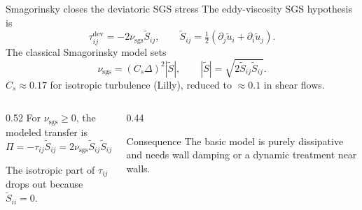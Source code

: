 \documentclass[aspectratio=169,11pt]{beamer}
\begin{document}
\begin{frame}{Smagorinsky closes the deviatoric SGS stress}
The eddy-viscosity SGS hypothesis is
\[
  \tau_{ij}^{\mathrm{dev}}=-2\nu_{\mathrm{sgs}}\widetilde S_{ij},
  \qquad
  \widetilde S_{ij}=\tfrac12(\partial_j\widetilde u_i+\partial_i\widetilde u_j).
\]
The classical Smagorinsky model sets
\[
  \nu_{\mathrm{sgs}}=(C_s\Delta)^2|\widetilde S|,
  \qquad
  |\widetilde S|=\sqrt{2\widetilde S_{ij}\widetilde S_{ij}}.
\]
{\small $C_s\approx0.17$ for isotropic turbulence (Lilly), reduced to $\approx0.1$ in shear flows.}
{\scriptsize{}\par}

\begin{columns}[T,onlytextwidth]
\begin{column}{0.52\textwidth}
For $\nu_{\mathrm{sgs}}\ge0$, the modeled transfer is
\[
  \Pi=-\tau_{ij}\widetilde S_{ij}
  =2\nu_{\mathrm{sgs}}\widetilde S_{ij}\widetilde S_{ij}\ge0.
\]
{\scriptsize The isotropic part of $\tau_{ij}$ drops out because $\widetilde S_{ii}=0$.\par}
\end{column}
\begin{column}{0.44\textwidth}
\begin{alertblock}{Consequence}
The basic model is purely dissipative and needs wall damping or a dynamic treatment near walls.
\end{alertblock}
\end{column}
\end{columns}
\end{frame}
\end{document}
